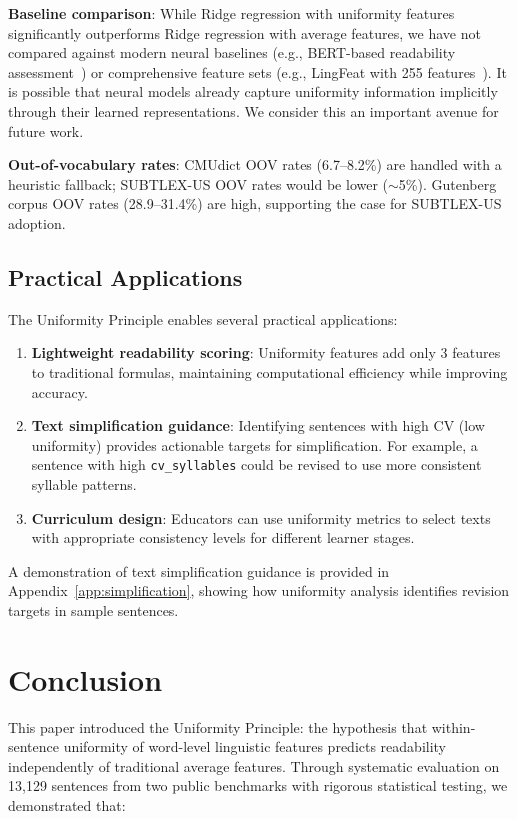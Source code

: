 \documentclass[11pt,letterpaper]{article}
\begin{document}
\textbf{Baseline comparison}: While Ridge regression with uniformity features significantly outperforms Ridge regression with average features, we have not compared against modern neural baselines (e.g., BERT-based readability assessment~\cite{Deutsch2020}) or comprehensive feature sets (e.g., LingFeat with 255 features~\cite{Lee2021}). It is possible that neural models already capture uniformity information implicitly through their learned representations. We consider this an important avenue for future work.

\textbf{Out-of-vocabulary rates}: CMUdict OOV rates (6.7--8.2\%) are handled with a heuristic fallback; SUBTLEX-US OOV rates would be lower ($\sim$5\%). Gutenberg corpus OOV rates (28.9--31.4\%) are high, supporting the case for SUBTLEX-US adoption.

\subsection{Practical Applications}

The Uniformity Principle enables several practical applications:

\begin{enumerate}
  \item \textbf{Lightweight readability scoring}: Uniformity features add only 3 features to traditional formulas, maintaining computational efficiency while improving accuracy.
  \item \textbf{Text simplification guidance}: Identifying sentences with high CV (low uniformity) provides actionable targets for simplification. For example, a sentence with high \texttt{cv\_syllables} could be revised to use more consistent syllable patterns.
  \item \textbf{Curriculum design}: Educators can use uniformity metrics to select texts with appropriate consistency levels for different learner stages.
\end{enumerate}

A demonstration of text simplification guidance is provided in Appendix~\ref{app:simplification}, showing how uniformity analysis identifies revision targets in sample sentences.

\section{Conclusion}

This paper introduced the Uniformity Principle: the hypothesis that within-sentence uniformity of word-level linguistic features predicts readability independently of traditional average features. Through systematic evaluation on 13,129 sentences from two public benchmarks with rigorous statistical testing, we demonstrated that:
\end{document}

